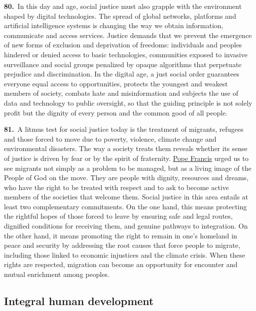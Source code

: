 \documentclass{article}
\begin{document}
\textbf{80.}\ In this day and age, social justice must also grapple with the environment shaped by digital technologies. The spread of global networks, platforms and artificial intelligence systems is changing the way we obtain information, communicate and access services. Justice demands that we prevent the emergence of new forms of exclusion and deprivation of freedoms: individuals and peoples hindered or denied access to basic technologies, communities exposed to invasive surveillance and social groups penalized by opaque algorithms that perpetuate prejudice and discrimination. In the digital age, a just social order guarantees everyone equal access to opportunities, protects the youngest and weakest members of society, combats hate and misinformation and subjects the use of data and technology to public oversight, so that the guiding principle is not solely profit but the dignity of every person and the common good of all people.

\textbf{81.}\ A litmus test for social justice today is the treatment of migrants, refugees and those forced to move due to poverty, violence, climate change and environmental disasters. The way a society treats them reveals whether its sense of justice is driven by fear or by the spirit of fraternity. \href{https://www.vatican.va/content/francesco/en.html}{Pope Francis} urged us to see migrants not simply as a problem to be managed, but as a living image of the People of God on the move.\cite{n109} They are people with dignity, resources and dreams, who have the right to be treated with respect and to ask to become active members of the societies that welcome them. Social justice in this area entails at least two complementary commitments. On the one hand, this means protecting the rightful hopes of those forced to leave by ensuring safe and legal routes, dignified conditions for receiving them, and genuine pathways to integration. On the other hand, it means promoting the right to remain in one's homeland in peace and security by addressing the root causes that force people to migrate, including those linked to economic injustices and the climate crisis. When these rights are respected, migration can become an opportunity for encounter and mutual enrichment among peoples.

\subsection{Integral human development}
\end{document}
